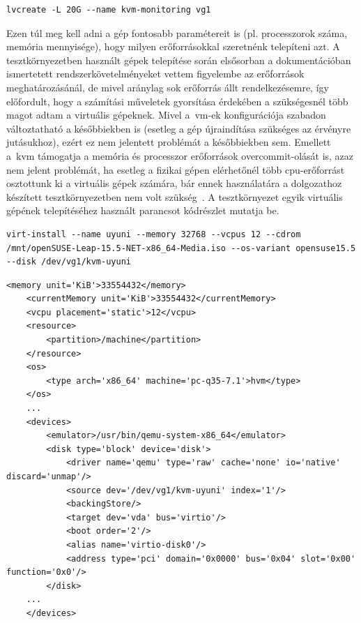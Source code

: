 \begin{lstlisting}[caption=Virtuális gépek logikai kötetének létrehozásához használt parancs.,label=lst:lvcreate]
	lvcreate -L 20G --name kvm-monitoring vg1
\end{lstlisting}

Ezen túl meg kell adni a gép fontosabb paramétereit is (pl. processzorok száma, memória mennyisége), hogy milyen erőforrásokkal szeretnénk telepíteni azt. A tesztkörnyezetben használt gépek telepítése során elsősorban a dokumentációban ismertetett rendszerkövetelményeket vettem figyelembe az erőforrások meghatározásánál, de mivel aránylag sok erőforrás állt rendelkezésemre, így előfordult, hogy a számítási műveletek gyorsítása érdekében a szükségesnél több magot adtam a virtuális gépeknek. Mivel a~\acrshort{vm}-ek konfigurációja szabadon változtatható a későbbiekben is (esetleg a gép újraindítása szükséges az érvényre jutásukhoz), ezért ez nem jelentett problémát a későbbiekben sem. Emellett a~\acrshort{kvm} támogatja a memória és processzor erőforrások \gls{overcommit}-olását is, azaz nem jelent problémát, ha esetleg a fizikai gépen elérhetőnél több \acrshort{cpu}-erőforrást osztottunk ki a virtuális gépek számára, bár ennek használatára a dolgozathoz készített tesztkörnyezetben nem volt szükség~\cite{RedHatKvmOvercommit}.
A tesztkörnyezet egyik virtuális gépének telepítéséhez használt parancsot  kódrészlet mutatja be.

\begin{lstlisting}[caption=Virtuális gép telepítése a virt-install segédprogrammal.,label=lst:virtinstall]
	virt-install --name uyuni --memory 32768 --vcpus 12 --cdrom /mnt/openSUSE-Leap-15.5-NET-x86_64-Media.iso --os-variant opensuse15.5 --disk /dev/vg1/kvm-uyuni
\end{lstlisting}

\begin{lstlisting}[caption=Virtuális gép leírófájljának részlete.,label=lst:virshxml]
	<memory unit='KiB'>33554432</memory>
	<currentMemory unit='KiB'>33554432</currentMemory>
	<vcpu placement='static'>12</vcpu>
	<resource>
		<partition>/machine</partition>
	</resource>
	<os>
		<type arch='x86_64' machine='pc-q35-7.1'>hvm</type>
	</os>
	...
	<devices>
		<emulator>/usr/bin/qemu-system-x86_64</emulator>
		<disk type='block' device='disk'>
			<driver name='qemu' type='raw' cache='none' io='native' discard='unmap'/>
			<source dev='/dev/vg1/kvm-uyuni' index='1'/>
			<backingStore/>
			<target dev='vda' bus='virtio'/>
			<boot order='2'/>
			<alias name='virtio-disk0'/>
			<address type='pci' domain='0x0000' bus='0x04' slot='0x00' function='0x0'/>
		</disk>
	...
	</devices>
\end{lstlisting}

